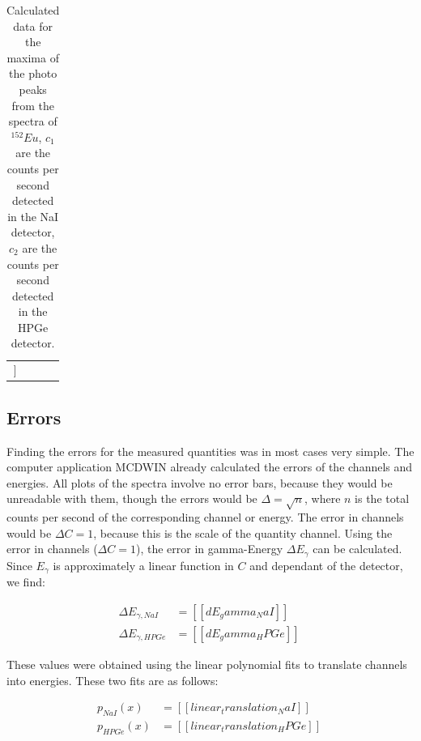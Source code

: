 \documentclass[a4paper]{article}
\begin{document}
\begin{table}[H]
\centering
\begin{tabular}{r|rrr}
\hline
[[table:eu152:peaks]]
\end{tabular}
\caption{Calculated data for the maxima of the photo peaks from the spectra of $^{152}Eu$, $c_1$ are the counts per second detected in the NaI detector, $c_2$ are the counts per second detected in the HPGe detector.}
\label{tab:eu152}
\end{table}


\subsection{Errors}

Finding the errors for the measured quantities was in most cases very simple. The computer application MCDWIN already calculated the errors of the channels and energies. All plots of the spectra involve no error bars, because they would be unreadable with them, though the errors would be $\Delta = \sqrt{n}$, where $n$ is the total counts per second of the corresponding channel or energy.
\newline
The error in channels would be $\Delta C = 1$, because this is the scale of the quantity channel.
\newline
Using the error in channels ($\Delta C = 1$), the error in gamma-Energy $\Delta E_{\gamma}$ can be calculated. Since $E_{\gamma}$ is approximately a linear function in $C$ and dependant of the detector, we find:

\begin{subequations}
\begin{align}
\Delta E_{\gamma,NaI} &= [[dE_gamma_NaI]] \ \label{eq:che_a} \\
\Delta E_{\gamma,HPGe} &= [[dE_gamma_HPGe]] \ \label{eq:che_b}
\end{align}
\end{subequations}

These values were obtained using the linear polynomial fits to translate channels into energies. These two fits are as follows:

\begin{subequations}
\begin{align}
p_{NaI}(x) &= [[linear_translation_NaI]] \ \\
p_{HPGe}(x) &= [[linear_translation_HPGe]] \
\end{align}
\end{subequations}
\end{document}
